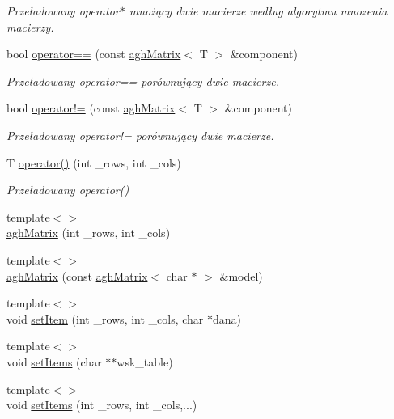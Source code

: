 \begin{DoxyCompactItemize}
\begin{DoxyCompactList}\small\item\em \-Przeładowany operator$\ast$ mnożący dwie macierze według algorytmu mnozenia macierzy. \end{DoxyCompactList}\item 
bool \hyperlink{classaghMatrix_a93103dd06db3bf44f5cec9cf9c7c4291}{operator==} (const \hyperlink{classaghMatrix}{agh\-Matrix}$<$ \-T $>$ \&component)
\begin{DoxyCompactList}\small\item\em \-Przeładowany operator== porównujący dwie macierze. \end{DoxyCompactList}\item 
bool \hyperlink{classaghMatrix_af9684a5452c0fbec2fb46edd7d47ff97}{operator!=} (const \hyperlink{classaghMatrix}{agh\-Matrix}$<$ \-T $>$ \&component)
\begin{DoxyCompactList}\small\item\em \-Przeładowany operator!= porównujący dwie macierze. \end{DoxyCompactList}\item 
\-T \hyperlink{classaghMatrix_ac29b6dbd1669ec1275ed12390d3db6e6}{operator()} (int \-\_\-rows, int \-\_\-cols)
\begin{DoxyCompactList}\small\item\em \-Przeładowany operator() \end{DoxyCompactList}\item 
{\footnotesize template$<$$>$ }\\\hyperlink{classaghMatrix_a8288884f09c54899166cdd1b489dc0ca}{agh\-Matrix} (int \-\_\-rows, int \-\_\-cols)
\item 
{\footnotesize template$<$$>$ }\\\hyperlink{classaghMatrix_a0a4a0d1165c55217a0be591b41ce1527}{agh\-Matrix} (const \hyperlink{classaghMatrix}{agh\-Matrix}$<$ char $\ast$ $>$ \&model)
\item 
{\footnotesize template$<$$>$ }\\void \hyperlink{classaghMatrix_a5f29f7264a68d67b6eca8631ce2b058a}{set\-Item} (int \-\_\-rows, int \-\_\-cols, char $\ast$dana)
\item 
{\footnotesize template$<$$>$ }\\void \hyperlink{classaghMatrix_a24882c48b62c492c11ac0f92593200a1}{set\-Items} (char $\ast$$\ast$wsk\-\_\-table)
\item 
{\footnotesize template$<$$>$ }\\void \hyperlink{classaghMatrix_a5e848430eade1c9252cde1ac362f65c5}{set\-Items} (int \-\_\-rows, int \-\_\-cols,...)
$$
\end{DoxyCompactItemize}
